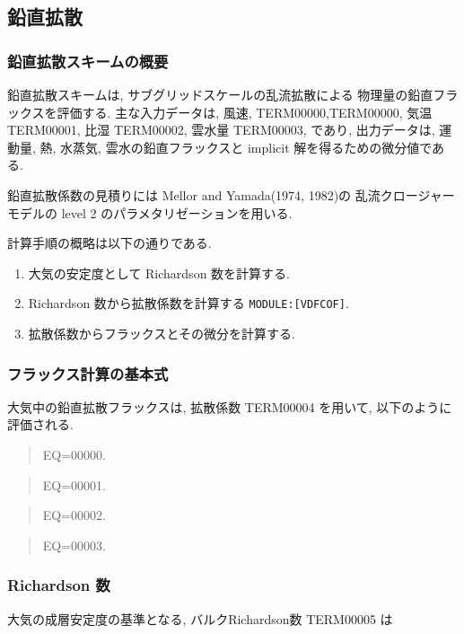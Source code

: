 ﻿
\subsection{鉛直拡散}

\subsubsection{鉛直拡散スキームの概要}

鉛直拡散スキームは,
サブグリッドスケールの乱流拡散による
物理量の鉛直フラックスを評価する.
主な入力データは, 風速, TERM00000,TERM00000, 気温 TERM00001, 比湿 TERM00002, 雲水量 TERM00003, であり,
出力データは, 運動量, 熱, 水蒸気, 雲水の鉛直フラックスと
implicit 解を得るための微分値である.

鉛直拡散係数の見積りには
Mellor and Yamada(1974, 1982)の
乱流クロージャーモデルの
level 2 のパラメタリゼーションを用いる.

計算手順の概略は以下の通りである.
\begin{enumerate}
\item 大気の安定度として
      Richardson 数を計算する.
\item Richardson 数から拡散係数を計算する \texttt{MODULE:[VDFCOF]}.
\item 拡散係数からフラックスとその微分を計算する.
\end{enumerate}

\subsubsection{フラックス計算の基本式}

大気中の鉛直拡散フラックスは, 
拡散係数 TERM00004 を用いて, 以下のように評価される.

\begin{quote}
EQ=00000.
\end{quote}
\begin{quote}
EQ=00001.
\end{quote}
\begin{quote}
EQ=00002.
\end{quote}
\begin{quote}
EQ=00003.
\end{quote}

\subsubsection{Richardson 数}

大気の成層安定度の基準となる,
バルクRichardson数 TERM00005 は

